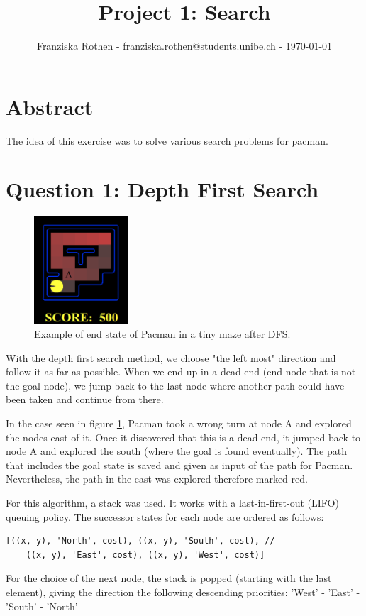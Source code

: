 \documentclass[onecolumn]{article}
\begin{document}
	
	\title{Project 1: Search}
	
	\author{Franziska Rothen - franziska.rothen@students.unibe.ch - \today}
	
	\maketitle\thispagestyle{empty}
	
	\section*{Abstract}
	The idea of this exercise was to solve various search problems for pacman.
	
	\section{Question 1: Depth First Search}
	
	\begin{figure}
		\includegraphics[width=3.5cm]{p1_1.PNG}
		\caption{Example of end state of Pacman in a tiny maze after DFS.}
		\label{fig:p1}
	\end{figure} 

	With the depth first search method, we choose "the left most" direction and follow it as far as possible. When we end up in a dead end (end node that is not the goal node), we jump back to the last node where another path could have been taken and continue from there. \newline
	
	In the case seen in figure \ref{fig:p1}, Pacman took a wrong turn at node A and explored the nodes east of it. Once it discovered that this is a dead-end, it jumped back to node A and explored the south (where the goal is found eventually). The path that includes the goal state is saved and given as input of the path for Pacman. Nevertheless, the path in the east was explored therefore marked red.
	
	For this algorithm, a stack was used. It works with a last-in-first-out (LIFO) queuing policy. The successor states for each node are ordered as follows: 
		\begin{lstlisting}[style=Python]
	[((x, y), 'North', cost), ((x, y), 'South', cost), //
	((x, y), 'East', cost), ((x, y), 'West', cost)]
	\end{lstlisting}
	For the choice of the next node, the stack is popped (starting with the last element), giving the direction the following descending priorities: 'West' - 'East' - 'South' - 'North' 
\end{document}
